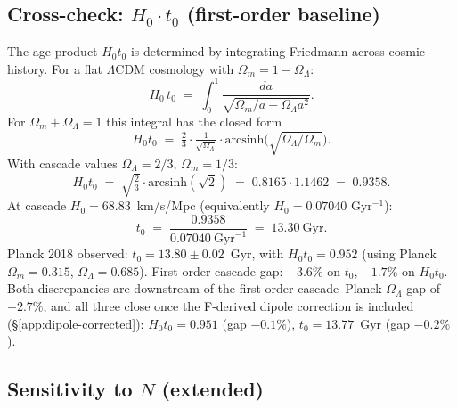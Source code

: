 \documentclass[11pt]{article}
\theoremstyle{plain}
\theoremstyle{definition}
\theoremstyle{remark}
\begin{document}
\subsection{Cross-check: $H_0 \cdot t_0$ (first-order baseline)}\label{app:H0t0}

The age product $H_0 t_0$ is determined by integrating Friedmann across cosmic history. For a flat $\Lambda$CDM cosmology with $\Omega_m = 1 - \Omega_\Lambda$:
\[
  H_0 \, t_0 \;=\; \int_0^1 \frac{da}{\sqrt{\Omega_m / a + \Omega_\Lambda a^2}}.
\]
For $\Omega_m + \Omega_\Lambda = 1$ this integral has the closed form
\[
  H_0 t_0 \;=\; \tfrac{2}{3} \cdot \tfrac{1}{\sqrt{\Omega_\Lambda}} \cdot \mathrm{arcsinh}\!\Big(\sqrt{\Omega_\Lambda / \Omega_m}\Big).
\]
With cascade values $\Omega_\Lambda = 2/3$, $\Omega_m = 1/3$:
\[
  H_0 t_0 \;=\; \sqrt{\tfrac{2}{3}} \cdot \mathrm{arcsinh}(\sqrt{2}) \;=\; 0.8165 \cdot 1.1462 \;=\; 0.9358.
\]
At cascade $H_0 = 68.83$~km/s/Mpc (equivalently $H_0 = 0.07040$ Gyr$^{-1}$):
\[
  t_0 \;=\; \frac{0.9358}{0.07040~\text{Gyr}^{-1}} \;=\; 13.30~\text{Gyr}.
\]
Planck 2018 observed: $t_0 = 13.80 \pm 0.02$~Gyr, with $H_0 t_0 = 0.952$ (using Planck $\Omega_m = 0.315$, $\Omega_\Lambda = 0.685$). First-order cascade gap: $-3.6\%$ on $t_0$, $-1.7\%$ on $H_0 t_0$. Both discrepancies are downstream of the first-order cascade--Planck $\Omega_\Lambda$ gap of $-2.7\%$, and all three close once the F-derived dipole correction is included (\S\ref{app:dipole-corrected}): $H_0 t_0 = 0.951$ (gap $-0.1\%$), $t_0 = 13.77$~Gyr (gap $-0.2\%$).

\subsection{Sensitivity to $N$ (extended)}\label{app:sensitivity-N}
\end{document}
